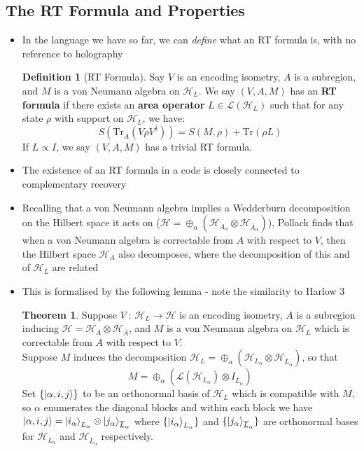 \documentclass[12pt,a4paper]{article}
\numberwithin{equation}{section}
\newcommand{\ol}[1]{\overline{#1}}
\theoremstyle{definition}
\newtheorem{definition}{Definition}[section]
\theoremstyle{theorem}
\newtheorem{theorem}{Theorem}[section]
\theoremstyle{example}
\begin{document}
	\subsection{The RT Formula and Properties}
	\begin{itemize}
		\item In the language we have so far, we can \textit{define} what an RT formula is, with no reference to holography
		\begin{definition}[RT Formula]
			Say $V$ is an encoding isometry, $A$ is a subregion, and $M$ is a von Neumann algebra on $\mathcal{H}_{L}$. We say $(V,A,M)$ has an \textbf{RT formula} if there exists an \textbf{area operator} $L\in\mathcal{L}(\mathcal{H}_{L})$ such that for any state $\rho$ with support on $\mathcal{H}_{L}$, we have:
			\begin{equation}
				S(\text{Tr}_{\ol{A}}(V\rho V^{\dagger}))=S(M,\rho)+\text{Tr}(\rho L)
			\end{equation}
			If $L\propto I$, we say $(V,A,M)$ has a trivial RT formula.
		\end{definition}
		\item The existence of an RT formula in a code is closely connected to complementary recovery
		\item Recalling that a von Neumann algebra implies a Wedderburn decomposition on the Hilbert space it acts on ($\mathcal{H}=\oplus_{\alpha}(\mathcal{H}_{A_{\alpha}}\otimes\mathcal{H}_{\ol{A}_{\alpha}})$), Pollack finds that when a von Neumann algebra is correctable from $A$ with respect to $V$, then the Hilbert space $\mathcal{H}_{A}$ also decomposes, where the decomposition of this and of $\mathcal{H}_{L}$ are related
		\item This is formalised by the following lemma - note the similarity to Harlow 3
		\begin{theorem}
			Suppose $V\;:\,\mathcal{H}_{L}\to\mathcal{H}$ is an encoding isometry, $A$ is a subregion inducing $\mathcal{H}=\mathcal{H}_{A}\otimes\mathcal{H}_{\ol{A}}$, and $M$ is a von Neumann algebra on $\mathcal{H}_{L}$ which is correctable from $A$ with respect to $V$.\\
			Suppose $M$ induces the decomposition $\mathcal{H}_{L}=\oplus_{\alpha}(\mathcal{H}_{L_{\alpha}}\otimes\mathcal{H}_{\ol{L}_{\alpha}})$, so that 
			\begin{equation}
				M=\oplus_{\alpha}(\mathcal{L}(\mathcal{H}_{L_{\alpha}})\otimes I_{\ol{L}_{\alpha}})
			\end{equation}
			Set $\{\ket{\alpha,i,j}\}$ to be an orthonormal basis of $\mathcal{H}_{L}$ which is compatible with $M$, so $\alpha$ enumerates the diagonal blocks and within each block we have $\ket{\alpha,i,j}=\ket{i_{\alpha}}_{L_{\alpha}}\otimes\ket{j_{\alpha}}_{\ol{L}_{\alpha}}$ where $\{\ket{i_{\alpha}}_{L_{\alpha}}\}$ and $\{\ket{j_{\alpha}}_{\ol{L}_{\alpha}}\}$ are orthonormal bases for $\mathcal{H}_{L_{\alpha}}$ and $\mathcal{H}_{\ol{L}_{\alpha}}$ respectively.\\

\end{theorem}
\end{itemize}
\end{document}
